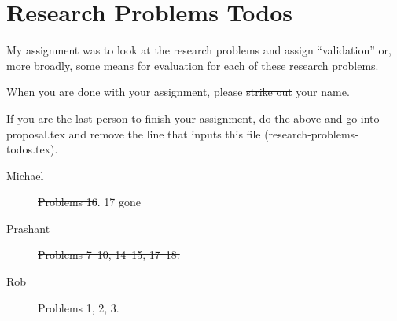 \section*{Research Problems Todos}

My assignment was to look at the research problems and assign ``validation'' or, more broadly, some means for evaluation for each of these research problems.

When you are done with your assignment, please \sout{strike out} your name.

If you are the last person to finish your assignment, do the above and go into proposal.tex and remove the line that inputs this file (research-problems-todos.tex).

\begin{description}
\item[Michael] \sout{Problems 16}.  17 gone
\item[Prashant] \sout{Problems 7--10, 14--15, 17--18.} 
\item[Rob] Problems 1, 2, 3.
\end{description}

\newpage